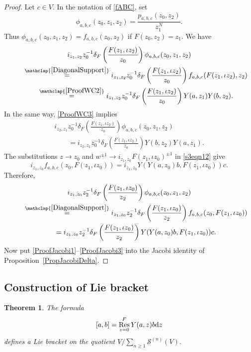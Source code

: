 \documentclass[10pt,a4paper]{amsart}
\numberwithin{equation}{section}
\newtheorem{Theorem}{Theorem}[section]
\theoremstyle{definition}
\DeclareMathOperator\Res{Res}
\begin{document}
\begin{proof}
Let $c\in V$. In the notation of \eqref{fABC}, set
\[
 \phi_{a,b,c}(z_0,z_1,z_2)=\frac{p_{a,b,c}(z_0,z_2)}{z_1^N}.
\]
Thus $\phi_{a,b,c}(z_0,z_1,z_2)=f_{a,b,c}(z_0,z_2)$ if $F(z_0,z_2)=z_1$. We have
\begin{gather}
i_{z_1,z_2}z_0^{-1}\delta_F\left(\frac{F(z_1,\iota z_2)}{z_0}\right)\phi_{a,b,c}(z_0,z_1,z_2)\nonumber\\
 \qquad\overset{\mathclap{\eqref{DiagonalSupport}}}{ = } i_{z_1,z_2}z_0^{-1}\delta_F\left(\frac{F(z_1,\iota z_2)}{z_0}\right) f_{a,b,c}(F(z_1,\iota z_2),z_2)\nonumber\\
\qquad \overset{\mathclap{\eqref{ProofWC2}}}{ = } i_{z_1,z_2}z_0^{-1}\delta_F\left(\frac{F(z_1,\iota z_2)}{z_0}\right)Y(a,z_1)Y(b,z_2).\label{ProofJacobi1}
\end{gather}
In the same way, \eqref{ProofWC3} implies
\begin{gather*}%
 i_{z_2,z_1}z_0^{-1}\delta_F\left(\frac{F(z_1,\iota z_2)}{z_0}\right)\phi_{a,b,c}(z_0,z_1,z_2)\\
\qquad =i_{z_2,z_1}z_0^{-1}\delta_F\left(\frac{F(z_1,\iota z_2)}{z_0}\right) Y(b,z_2)Y(a,z_1).
\end{gather*}
The substitutions $z\to z_0$ and $w^{\pm1}\to i_{z_1,z_0}F(z_1,\iota z_0)^{\pm1}$ in \eqref{s3eqn12} give
\[ %
 i_{z_1,z_0} f_{a,b,c}(z_0,F(z_1,\iota z_0))=i_{z_1,z_0}Y(Y(a,z_0)b,F(z_1,\iota z_0))c.
\]
Therefore,
\begin{gather}
 i_{z_1,z_0}z_2^{-1}\delta_F\left(\frac{F(z_1,\iota z_0)}{z_2}\right)\phi_{a,b,c}(z_0,z_1,z_2)\nonumber\\
\qquad \overset{\mathclap{\eqref{DiagonalSupport}}}{ = }i_{z_1,z_0}z_2^{-1}\delta_F\left(\frac{F(z_1,\iota z_0)}{z_2}\right)f_{a,b,c}(z_0,F(z_1,\iota z_0))\nonumber\\
 \qquad= i_{z_1,z_0}z_2^{-1}\delta_F\left(\frac{F(z_1,\iota z_0)}{z_2}\right)Y(Y(a,z_0)b,F(z_1,\iota z_0))c.\label{ProofJacobi3}
\end{gather}
Now put \eqref{ProofJacobi1}--\eqref{ProofJacobi3} into the Jacobi identity of Proposition~\ref{PropJacobiDelta}.
\end{proof}


\subsection{Construction of Lie bracket}
\label{s43}


\begin{Theorem}
The formula
\begin{equation}
\label{s4eqn1}
[a,b] = \Res_{z=0}^F Y(a,z)b {\rm d}z
\end{equation}
defines a Lie bracket on the quotient $V/\sum_{n\geqslant1}\mathcal{S}^{(n)}(V)$.
\end{Theorem}
\end{document}
